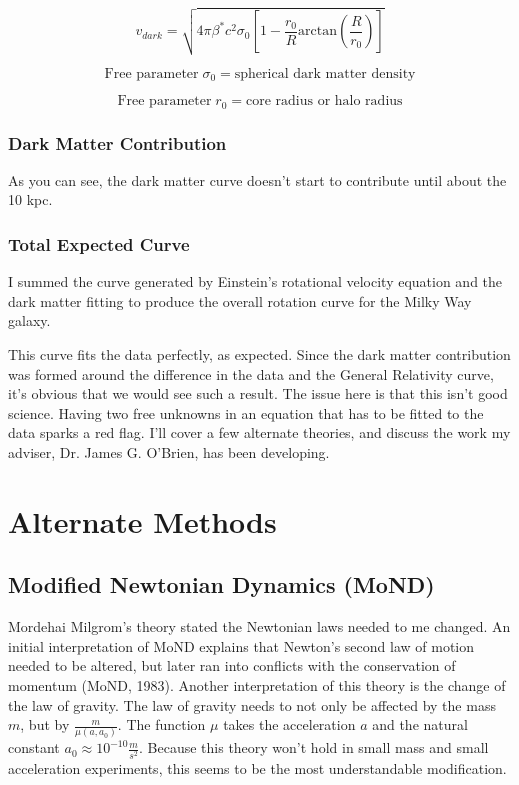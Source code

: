 \documentclass[titlepage]{article}
\begin{document}
\begin{equation}
v_{dark} = \sqrt{4\pi\beta^*c^2\sigma_0\left[1-\frac{r_0}{R}\text{arctan}\left(\frac{R}{r_0}\right)\right]}
\end{equation}

\begin{equation}
\text{Free parameter}\;\sigma_0 = \text{spherical dark matter density}
\end{equation} %

\begin{equation}
\text{Free parameter}\;r_0 = \text{core radius or halo radius}
\end{equation}

\subsubsection{Dark Matter Contribution}

As you can see, the dark matter curve doesn't start to contribute until about the 10 kpc.

\subsubsection{Total Expected Curve}
I summed the curve generated by Einstein's rotational velocity equation and the dark matter fitting to produce the overall rotation curve for the Milky Way galaxy.

This curve fits the data perfectly, as expected. Since the dark matter contribution was formed around the difference in the data and the General Relativity curve, it's obvious that we would see such a result. The issue here is that this isn't good science. Having two free unknowns in an equation that has to be fitted to the data sparks a red flag. I'll cover a few alternate theories, and discuss the work my adviser, Dr. James G. O'Brien, has been developing.

\section{Alternate Methods}

\subsection{Modified Newtonian Dynamics (MoND)}
Mordehai Milgrom's theory stated the Newtonian laws needed to me changed. An initial interpretation of MoND explains that Newton's second law of motion needed to be altered, but later ran into conflicts with the conservation of momentum (MoND, 1983). Another interpretation of this theory is the change of the law of gravity. The law of gravity needs to not only be affected by the mass $m$, but by $\frac{m}{\mu(a,a_0)}$. The function $\mu$ takes the acceleration $a$ and the natural constant $a_0 \approx 10^{-10} \frac{m}{s^2}$. Because this theory won't hold in small mass and small acceleration experiments, this seems to be the most understandable modification.
\end{document}

